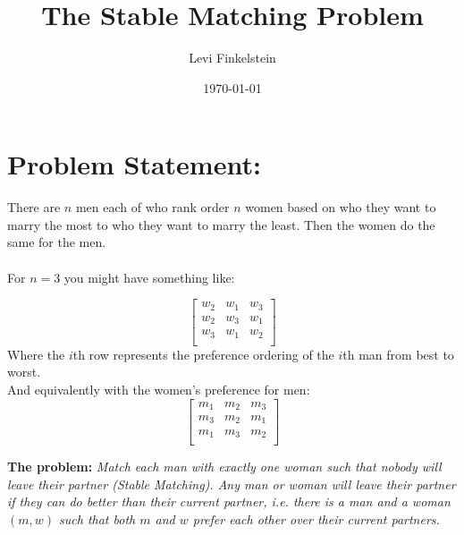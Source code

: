 \usepackage{pgfplots}
\title{The Stable Matching Problem}
\author{Levi Finkelstein}
\date{\today}

\maketitle

\section*{Problem Statement:}
There are $n$ men each of who rank order $n$ women based on who they want to marry the most to who they want to marry the least. Then the women do the same for the men.\\\\
For $n=3$ you might have something like:

$$\begin{bmatrix}
    w_2 & w_1 & w_3\\
    w_2 & w_3 & w_1\\
    w_3 & w_1 & w_2\\
\end{bmatrix}$$ Where the $i$th row represents the preference ordering of the $i$th man from best to worst.\\
And equivalently with the women's preference for men:
$$\begin{bmatrix}
    m_1 & m_2 & m_3\\
    m_3 & m_2 & m_1\\
    m_1 & m_3 & m_2\\
\end{bmatrix}$$

\textbf{The problem:} \textit{Match each man with exactly one woman such that nobody will leave their partner (Stable Matching). Any man or woman will leave their partner if they can do better than their current partner, i.e. there is a man and a woman $(m,w)$ such that both $m$ and $w$ prefer each other over their current partners.}
\\\\





